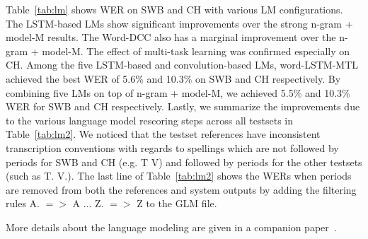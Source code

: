 \documentclass[a4paper]{article}
\begin{document}
Table~\ref{tab:lm} shows WER on SWB and CH with various LM
configurations.  The LSTM-based LMs show significant improvements over
the strong n-gram + model-M results.  The Word-DCC also has a marginal
improvement over the n-gram + model-M.  The effect of multi-task
learning was confirmed especially on CH.  Among the five LSTM-based
and convolution-based LMs, word-LSTM-MTL achieved the best WER of
5.6\% and 10.3\% on SWB and CH respectively. By combining five LMs on
top of n-gram + model-M, we achieved 5.5\% and 10.3\% WER for SWB and
CH respectively. Lastly, we summarize the improvements due to the
various language model rescoring steps across all testsets in
Table~\ref{tab:lm2}. We noticed that the testset references have
inconsistent transcription conventions with regards to spellings which
are not followed by periods for SWB and CH (e.g. T V) and followed by
periods for the other testsets (such as T. V.). The last line of
Table~\ref{tab:lm2} shows the WERs when periods are removed from both
the references and system outputs by adding the filtering rules A. $=>$
A ... Z. $=>$ Z to the GLM file.

More details about the language modeling are
given in a companion paper~\cite{kurata17}.

\begin{table}[htpb!]
\begin{center}
\end{center}
\caption{\label{tab:lm2}
Word error rates for the different LM rescoring steps across all testsets. Last line shows WERs after '.' removal from the references and system outputs.}
\end{table}
\end{document}
